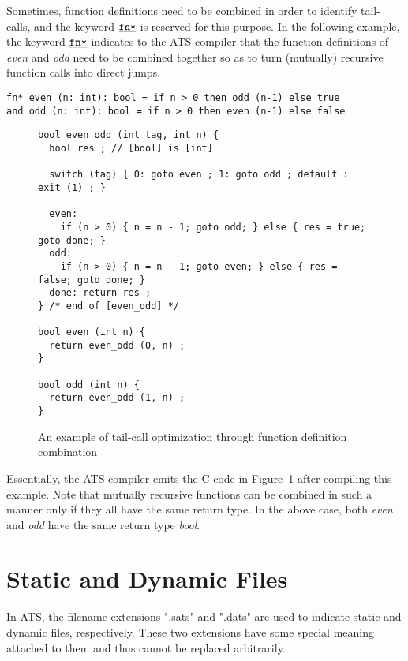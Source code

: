 Sometimes, function definitions need to be combined in order to identify
tail-calls, and the keyword $\underline{\texttt{fn*}}$ is reserved for this purpose. In
the following example, the keyword $\underline{\texttt{fn*}}$ indicates to the ATS
compiler that the function definitions of {\it even} and {\it odd} need to
be combined together so as to turn (mutually) recursive function calls
into direct jumps.
\begin{verbatim}
fn* even (n: int): bool = if n > 0 then odd (n-1) else true
and odd (n: int): bool = if n > 0 then even (n-1) else false
\end{verbatim}
\begin{figure}[thp]
\begin{verbatim}
bool even_odd (int tag, int n) {
  bool res ; // [bool] is [int]

  switch (tag) { 0: goto even ; 1: goto odd ; default : exit (1) ; }

  even:
    if (n > 0) { n = n - 1; goto odd; } else { res = true; goto done; }
  odd:
    if (n > 0) { n = n - 1; goto even; } else { res = false; goto done; }
  done: return res ;
} /* end of [even_odd] */

bool even (int n) {
  return even_odd (0, n) ;
}

bool odd (int n) {
  return even_odd (1, n) ;
}
\end{verbatim}
\caption{An example of tail-call optimization through function definition combination}
\label{figure:even_odd_combination_in_c}
\end{figure}
Essentially, the ATS compiler emits the C code in
Figure~\ref{figure:even_odd_combination_in_c} after compiling this
example. Note that mutually recursive functions can be combined in such a
manner only if they all have the same return type. In the above case, both
{\it even} and {\it odd} have the same return type {\it bool}.


\section{Static and Dynamic Files}
In ATS, the filename extensions ".sats" and ".dats" are used to indicate
static and dynamic files, respectively. These two extensions have some
special meaning attached to them and thus cannot be replaced arbitrarily.

